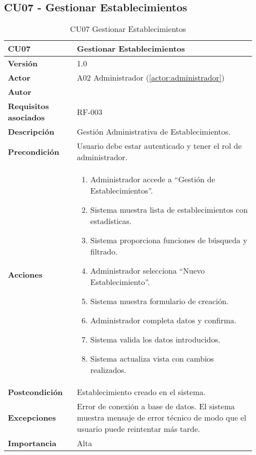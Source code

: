 \subsection{CU07 - Gestionar Establecimientos}

\begin{table}[H]
	\centering
	\begin{tabularx}{\linewidth}{ p{} p{} }
		\toprule
		\textbf{CU07}    & \textbf{Gestionar Establecimientos} \\
		\toprule
		\textbf{Versión}              & 1.0    \\
		\textbf{Actor}                & A02 Administrador (\ref{actor:administrador}) \\
		\textbf{Autor}                & \nombre \\
		\textbf{Requisitos asociados} & RF-003 \\
		\textbf{Descripción}          & Gestión Administrativa de Establecimientos. \\
		\textbf{Precondición}         & Usuario debe estar autenticado y tener el rol de administrador. \\
		\textbf{Acciones}             &
		\begin{enumerate}
			\def\labelenumi{\arabic{enumi}.}
			\tightlist
			\item Administrador accede a ``Gestión de Establecimientos''.
            \item Sistema muestra lista de establecimientos con estadísticas.
            \item Sistema proporciona funciones de búsqueda y filtrado.
            \item Administrador selecciona ``Nuevo Establecimiento''.
 	    \item Sistema muestra formulario de creación.
            \item Administrador completa datos y confirma.
            \item Sistema valida los datos introducidos.
            \item Sistema actualiza vista con cambios realizados.
		\end{enumerate}\\
		\textbf{Postcondición}        & Establecimiento creado en el sistema.\\
		\textbf{Excepciones}          & Error de conexión a base de datos. El sistema muestra mensaje de error técnico de modo que el usuario puede reintentar más tarde.\\
		\textbf{Importancia}          & Alta \\
		\bottomrule
	\end{tabularx}
	\caption{CU07 Gestionar Establecimientos}
	\label{cu:gestionar-establecimientos}
\end{table}

